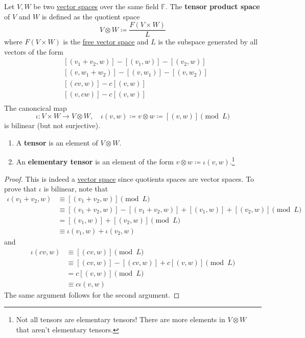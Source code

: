 	\begin{definition}
		\label{def:tensor}
		Let $V, W$ be two \hyperref[def:vector-space]{vector spaces} over the same field $\mathbb{F}$. The \textbf{tensor product space} of $V$ and $W$ is defined as the quotient space 
		\begin{equation}
			V \otimes W \coloneqq \frac{F(V \times W)}{L}
		\end{equation}
		where $F(V \times W)$ is the \hyperref[def:free-vector-space]{free vector space} and $L$ is the subspace generated by all vectors of the form 
		\begin{align}
			& [(v_1 + v_2, w)] - [(v_1, w)] - [(v_2, w)] \\
			& [(v, w_1 + w_2)] - [(v, w_1)] - [(v, w_2)] \\
			& [(cv, w)] - c [(v, w)] \\
			& [(v, cw)] - c [(v, w)] \\
		\end{align}
		The canoncical map 
		\begin{equation}
			\iota: V \times W \to V \otimes W, \quad \iota(v,w) \coloneqq v \otimes w \coloneqq [(v, w)] \pmod{L}
		\end{equation}
		is bilinear (but not surjective). 
		\begin{enumerate}
		  \item A \textbf{tensor} is an element of $V \otimes W$. 
			\item An \textbf{elementary tensor} is an element of the form $v \otimes w \coloneqq \iota(v, w)$.\footnote{Not all tensors are elementary tensors! There are more elements in $V \otimes W$ that aren't elementary tensors. }
		\end{enumerate}
	\end{definition}
	\begin{proof}
	  This is indeed a \hyperref[def:vector-space]{vector space} since quotients spaces are vector spaces. To prove that $\iota$ is bilinear, note that 
		\begin{align}
			\iota(v_1 + v_2, w) & \equiv [(v_1 + v_2, w)] \pmod{L} \\ 
													& \equiv [(v_1 + v_2, w)] - [(v_1 + v_2, w)] + [(v_1, w)] + [(v_2, w)] \pmod{L} \\ 
													& = [(v_1, w)] + [(v_2, w)] \pmod{L} \\ 
													& \equiv \iota(v_1, w) + \iota(v_2, w)
		\end{align}
		and 
		\begin{align}
			\iota(cv, w) & \equiv [(cv, w)] \pmod{L} \\ 
									 & \equiv [(cv, w)] - [(cv, w)] + c[(v, w)] \pmod{L} \\ 
									 & = c [(v, w)] \pmod{L} \\ 
									 & \equiv c \iota(v, w) 
		\end{align}
		The same argument follows for the second argument. 
	\end{proof}

